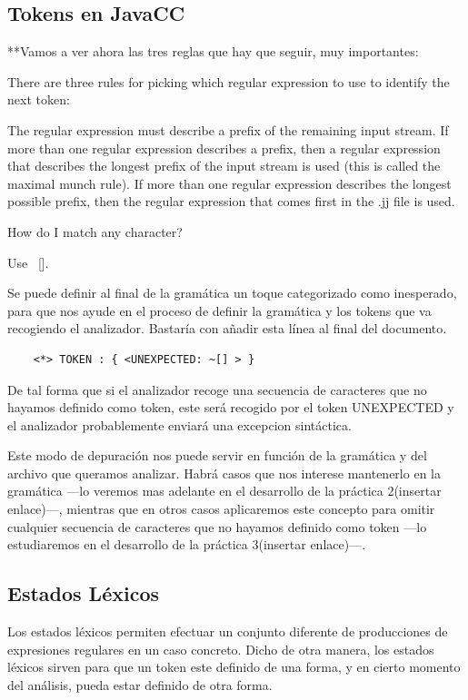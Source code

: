 \subsection{Tokens en JavaCC}

**Vamos a ver ahora las tres reglas que hay que seguir, muy importantes:

There are three rules for picking which regular expression to use to identify the next token:

The regular expression must describe a prefix of the remaining input stream.
If more than one regular expression describes a prefix, then a regular expression that describes the longest prefix of the input stream is used (this is called the maximal munch rule).
If more than one regular expression describes the longest possible prefix, then the regular expression that comes first in the .jj file is used.

How do I match any character?

Use ~[].

Se puede definir al final de la gramática un toque categorizado como inesperado, para que nos ayude en el proceso de definir la gramática y los tokens que va recogiendo el analizador. Bastaría con añadir esta línea al final del documento.

\lstset{inputencoding=utf8/latin1}
\begin{lstlisting}
	<*> TOKEN : { <UNEXPECTED: ~[] > }     
\end{lstlisting}

De tal forma que si el analizador recoge una secuencia de caracteres que no hayamos definido como token, este será recogido por el token UNEXPECTED y el analizador probablemente enviará una excepcion sintáctica.

Este modo de depuración nos puede servir en función de la gramática y del archivo que queramos analizar. Habrá casos que nos interese mantenerlo en la gramática ---lo veremos mas adelante en el desarrollo de la práctica 2(insertar enlace)---, mientras que en otros casos aplicaremos este concepto para omitir cualquier secuencia de caracteres que no hayamos definido como token ---lo estudiaremos en el desarrollo de la práctica 3(insertar enlace)---.


\subsection{Estados Léxicos}
\noindent Los estados léxicos permiten efectuar un conjunto diferente de producciones de expresiones regulares en un caso concreto. Dicho de otra manera, los estados léxicos sirven para que un token este definido de una forma, y en cierto momento del análisis, pueda estar definido de otra forma.

